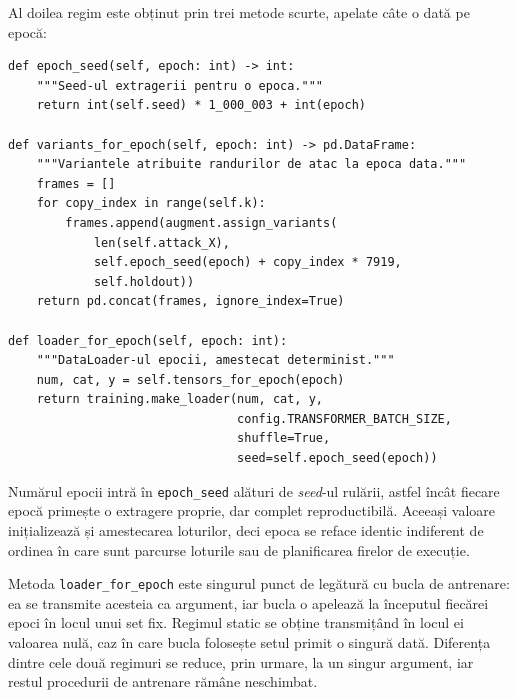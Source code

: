 Al doilea regim este obținut prin trei metode scurte, apelate câte o dată pe
epocă:

\begin{verbatim}
def epoch_seed(self, epoch: int) -> int:
    """Seed-ul extragerii pentru o epoca."""
    return int(self.seed) * 1_000_003 + int(epoch)

def variants_for_epoch(self, epoch: int) -> pd.DataFrame:
    """Variantele atribuite randurilor de atac la epoca data."""
    frames = []
    for copy_index in range(self.k):
        frames.append(augment.assign_variants(
            len(self.attack_X),
            self.epoch_seed(epoch) + copy_index * 7919,
            self.holdout))
    return pd.concat(frames, ignore_index=True)

def loader_for_epoch(self, epoch: int):
    """DataLoader-ul epocii, amestecat determinist."""
    num, cat, y = self.tensors_for_epoch(epoch)
    return training.make_loader(num, cat, y,
                                config.TRANSFORMER_BATCH_SIZE,
                                shuffle=True,
                                seed=self.epoch_seed(epoch))
\end{verbatim}

Numărul epocii intră în \texttt{epoch\_seed} alături de \textit{seed}-ul rulării,
astfel încât fiecare epocă primește o extragere proprie, dar complet
reproductibilă. Aceeași valoare inițializează și amestecarea loturilor, deci
epoca se reface identic indiferent de ordinea în care sunt parcurse loturile
sau de planificarea firelor de execuție.

Metoda \texttt{loader\_for\_epoch} este singurul punct de legătură cu bucla de
antrenare: ea se transmite acesteia ca argument, iar bucla o apelează la
începutul fiecărei epoci în locul unui set fix. Regimul static se obține
transmițând în locul ei valoarea nulă, caz în care bucla folosește setul primit
o singură dată. Diferența dintre cele două regimuri se reduce, prin urmare, la
un singur argument, iar restul procedurii de antrenare rămâne neschimbat.

